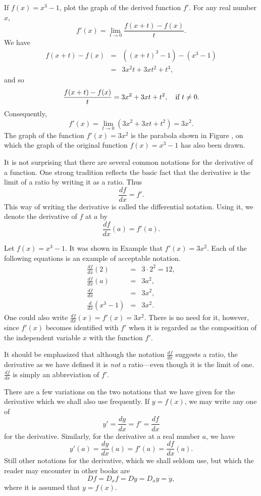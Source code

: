 \begin{example}{\label{exam 1.6.4}}
If $f(x) = x^3 - 1$,
plot the graph of the derived function $f'$.
For any real number $x$,
$$
f'(x) = \lim_{t \rightarrow 0} \frac {f(x + t) - f(x)}{t} .
$$
We have
\begin{eqnarray*}
f(x + t) - f(x)
&=& ((x + t)^3 - 1) - (x^3 - 1) \\
&=& 3x^2t + 3xt^2 + t^3 ,
\end{eqnarray*}
and so
$$
\frac {f(x + t) - f(x)}{t} = 3x^2 + 3xt + t^2,
\quad \mbox{if $t \neq 0$}.
$$
Consequently,
$$
f'(x) =
\lim_{t \rightarrow 0} (3x^2 + 3xt + t^2) = 3x^2 .
$$
The graph of the function $f'(x) = 3x^2$
is the parabola shown in Figure ,
on which the graph of the original function $f(x) = x^3 - 1$
has also been drawn.
\end{example}

It is not surprising that there are
several common notations for the derivative of a function.
One strong tradition reflects the basic fact that
the derivative is the limit of a ratio by writing it as a ratio.
Thus
$$
\frac{df}{dx} = f' .
$$
This way of writing the derivative
is called the differential notation.
Using it,
we denote the derivative of $f$ at $a$ by
$$
\frac{df}{dx} (a) = f'(a) .
$$


\begin{example}{\label{exam 1.6.5}}
Let $f(x) = x^3 - 1$. It was shown in Example 
that $f'(x) = 3x^2$.
Each of the following equations
is an example of acceptable notation.
\begin{eqnarray*}
\frac{df}{dx} (2)
&=&  3 \cdot 2^2 = 12 ,  \\
\frac{df}{dx} (a)
&=&  3a^2 ,    \\
\frac{df}{dx}
&=&  3x^2 ,    \\
\frac{d}{dx} (x^3 - 1)
&=&  3x^2 .
\end{eqnarray*}
One could also write $\frac{df}{dx} (x) = f'(x) = 3x^2$.
There is no need for it, however,
since $f'(x)$ becomes identified with $f'$
when it is regarded as the composition of the independent variable $x$
with the function $f'$.
\end{example}

It should be emphasized that
although the notation $\frac{df}{dx}$ suggests a ratio,
the derivative as we have defined it is \emph{not} a ratio---even though
it is the limit of one.
$\frac{df}{dx}$ is simply an abbreviation of $f'$.

There are a few variations on the two notations
that we have given for the derivative
which we shall also use frequently.
If $y = f(x)$, we may write any one of
$$
y' = \frac{dy}{dx}  = f' = \frac{df}{dx}
$$
for the derivative.
Similarly, for the derivative at a real number $a$,
we have
$$
y'(a) = {\frac{dy}{dx}} (a) = f'(a) = {\frac{df}{dx}} (a) .
$$
Still other notations for the derivative,
which we shall seldom use,
but which the reader may encounter in other books are
$$
Df = D_{x}f = Dy = D_{x}y = \dot{y} ,
$$
where it is assumed that $y = f(x)$.

